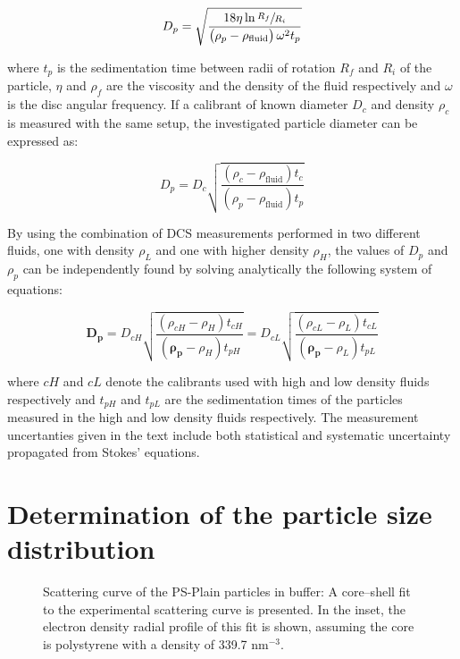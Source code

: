 \begin{equation}
D_p=\sqrt{\frac{18\eta\ln\sfrac{R_f}{R_i}}{\left( \rho_p - \rho_{\text{fluid}} \right)\omega^2 t_p}}
\label{eq:stokes}
\end{equation}

where $t_p$ is the sedimentation time between radii of rotation $R_f$ and $R_i$ of the particle, $\eta$ and $\rho_f$ are the viscosity and the density of the fluid respectively and $\omega$ is the disc angular frequency. If a calibrant of known diameter $D_c$ and density $\rho_c$ is measured with the same setup, the investigated particle diameter can be expressed as:

\begin{equation}
D_p=D_c\sqrt{\frac{\left( \rho_c - \rho_{\text{fluid}} \right) t_c}{\left( \rho_p - \rho_{\text{fluid}} \right) t_p}}
\label{eq:software}
\end{equation}

By using the combination of DCS measurements performed in two different fluids, one with density $\rho_L$ and one with higher density $\rho_H$, the values of $D_p$ and $\rho_p$ can be independently found by solving analytically the following system of equations:

\begin{equation}
\bm{D_p} = D_{cH}\sqrt{\frac{\left( \rho_{cH} - \rho_H \right) t_{cH}}{\left( \bm{\rho_p} - \rho_H \right) t_{pH}}} = D_{cL}\sqrt{\frac{\left( \rho_{cL} - \rho_L \right) t_{cL}}{\left( \bm{\rho_p} - \rho_L \right) t_{pL}}}
\label{eq:DCS_sys}
\end{equation}

where $cH$ and $cL$ denote the calibrants used with high and low density fluids respectively and $t_{pH}$ and $t_{pL}$ are the sedimentation times of the particles measured in the high and low density fluids respectively. The measurement uncertanties given in the text include both statistical and systematic uncertainty propagated from Stokes' equations.

\section{Determination of the particle size distribution}
\label{sec:size_validation}

\begin{figure}
	\begin{center}
		
	\end{center}
	\caption[Scattering curve of the PS-Plain particles in buffer.]{Scattering curve of the PS-Plain particles in buffer: A core–shell fit to the experimental scattering curve is presented. In the inset, the electron density radial profile of this fit is shown, assuming the core is polystyrene with a density of 339.7 nm$^{-3}$.}
	\label{fig:PSPlainSingleContrastSAXS}
\end{figure}

